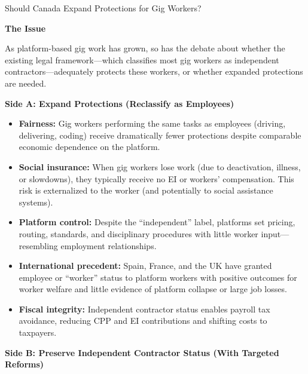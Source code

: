\begin{policydebate}{Should Canada Expand Protections for Gig Workers?}

\textbf{The Issue}

As platform-based gig work has grown, so has the debate about whether the existing
legal framework---which classifies most gig workers as independent contractors---adequately
protects these workers, or whether expanded protections are needed.

\vspace{8pt}
\textbf{Side A: Expand Protections (Reclassify as Employees)}

\begin{itemize}
  \item \textbf{Fairness:} Gig workers performing the same tasks as employees (driving, delivering, coding) receive dramatically fewer protections despite comparable economic dependence on the platform.
  \item \textbf{Social insurance:} When gig workers lose work (due to deactivation, illness, or slowdowns), they typically receive no EI or workers' compensation. This risk is externalized to the worker (and potentially to social assistance systems).
  \item \textbf{Platform control:} Despite the ``independent'' label, platforms set pricing, routing, standards, and disciplinary procedures with little worker input---resembling employment relationships.
  \item \textbf{International precedent:} Spain, France, and the UK have granted employee or ``worker'' status to platform workers with positive outcomes for worker welfare and little evidence of platform collapse or large job losses.
  \item \textbf{Fiscal integrity:} Independent contractor status enables payroll tax avoidance, reducing CPP and EI contributions and shifting costs to taxpayers.
\end{itemize}

\textbf{Side B: Preserve Independent Contractor Status (With Targeted Reforms)}


\end{policydebate}
